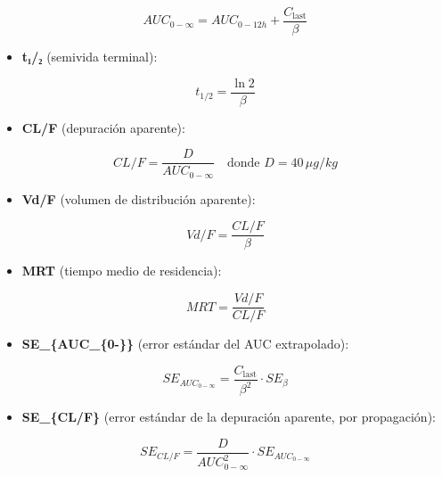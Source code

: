 \documentclass[11pt]{article}
\providecommand{\tightlist}{%
      \setlength{\itemsep}{0pt}\setlength{\parskip}{0pt}}
\begin{document}
\[
AUC_{0-\infty} = AUC_{0-12h} + \frac{C_{\text{last}}}{\beta}
\]

\begin{itemize}
\tightlist
\item
  \textbf{t₁/₂} (semivida terminal):
\end{itemize}

\[
t_{1/2} = \frac{\ln 2}{\beta}
\]

\begin{itemize}
\tightlist
\item
  \textbf{CL/F} (depuración aparente):
\end{itemize}

\[
CL/F = \frac{D}{AUC_{0-\infty}} \quad \text{donde } D = 40 \, \mu g/kg
\]

\begin{itemize}
\tightlist
\item
  \textbf{Vd/F} (volumen de distribución aparente):
\end{itemize}

\[
Vd/F = \frac{CL/F}{\beta}
\]

\begin{itemize}
\tightlist
\item
  \textbf{MRT} (tiempo medio de residencia):
\end{itemize}

\[
MRT = \frac{Vd/F}{CL/F}
\]

\begin{itemize}
\tightlist
\item
  \textbf{SE\_\{AUC\_\{0-\infty\}\}} (error estándar del AUC
  extrapolado):
\end{itemize}

\[
SE_{AUC_{0-\infty}} = \frac{C_{\text{last}}}{\beta^2} \cdot SE_{\beta}
\]

\begin{itemize}
\tightlist
\item
  \textbf{SE\_\{CL/F\}} (error estándar de la depuración aparente, por
  propagación):
\end{itemize}

\[
SE_{CL/F} = \frac{D}{AUC_{0-\infty}^2} \cdot SE_{AUC_{0-\infty}}
\]
\end{document}
